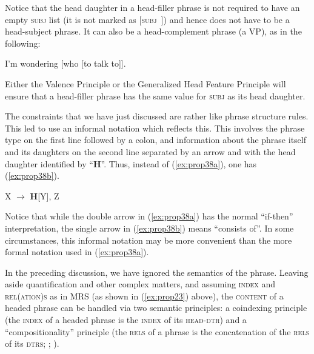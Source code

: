 \documentclass[output=paper
	        ,collection
	        ,collectionchapter
 	        ,biblatex
                ,babelshorthands
                ,newtxmath
                ,draftmode
                ,colorlinks, citecolor=brown
]{langscibook}
\begin{document}
Notice that the head daughter in a head-filler phrase is not required to have an empty \textsc{subj} list (it is not marked as [\textsc{subj}~\eliste]) and hence does not have to be a head-subject phrase. It can also be a head-complement phrase (a VP), as in the following:

\ea\label{ex:prop37}
I’m wondering [who [to talk to]].
\z

\noindent
Either the Valence Principle or the Generalized Head Feature Principle will ensure that a head-filler phrase has the same value for \textsc{subj} as its head daughter.

The constraints that we have just discussed are rather like phrase structure rules. This led \citet[33]{GSag2000a-u} to use an informal notation which reflects this. This involves the phrase type on the first line followed by a colon, and information about the phrase itself and its daughters on the second line separated by an arrow and with the head daughter identified by ``\textbf{H}''. Thus, instead of (\ref{ex:prop38a}), one has (\ref{ex:prop38b}).

\eal\label{ex:prop38}
\ex\label{ex:prop38a}
 \impl
{}
\ex\label{ex:prop38b}
	
X $\to$ \textbf{H}[Y], Z
\zl

\noindent
Notice that while the double arrow in (\ref{ex:prop38a}) has the normal ``if-then'' interpretation, the single arrow in (\ref{ex:prop38b}) means ``consists of''. In some circumstances, this informal notation may be more convenient than the more formal notation used in (\ref{ex:prop38a}).

In the preceding discussion, we have ignored the semantics of the phrase. 
Leaving aside quantification and other complex matters, and assuming \textsc{index} and
\textsc{rel(ation)s} as in MRS (as shown in (\ref{ex:prop23}) above),
the \textsc{content} of a headed phrase can be handled via two semantic principles: a coindexing principle (the \textsc{index} of a headed phrase is the
\textsc{index} of its \textsc{head-dtr}) and a ``compositionality'' principle (the \textsc{rels} of
a phrase is the concatenation of the \textsc{rels} of its \textsc{dtrs}; \citealp[Section~4.3.2,
Section~5]{CFPS2005a}; ).
\end{document}
